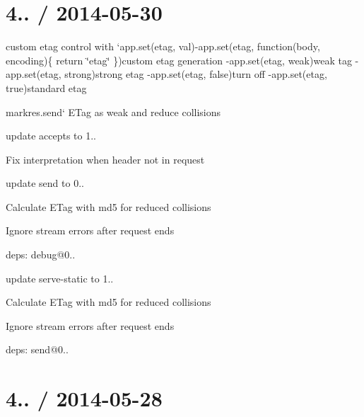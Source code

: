 \section*{4.. / 2014-\/05-\/30 }


\begin{DoxyItemize}
\item custom etag control with `app.set(\textquotesingle{}etag\textquotesingle{}, val){\ttfamily  -\/}app.\+set(\textquotesingle{}etag\textquotesingle{}, function(body, encoding)\{ return \textquotesingle{}\char`\"{}etag\char`\"{}\textquotesingle{} \}){\ttfamily custom etag generation -\/}app.\+set(\textquotesingle{}etag\textquotesingle{}, \textquotesingle{}weak\textquotesingle{}){\ttfamily weak tag -\/}app.\+set(\textquotesingle{}etag\textquotesingle{}, \textquotesingle{}strong\textquotesingle{}){\ttfamily strong etag -\/}app.\+set(\textquotesingle{}etag\textquotesingle{}, false){\ttfamily turn off -\/}app.\+set(\textquotesingle{}etag\textquotesingle{}, true){\ttfamily standard etag}
\item {\ttfamily mark}res.\+send` E\+Tag as weak and reduce collisions
\item update accepts to 1..
\begin{DoxyItemize}
\item Fix interpretation when header not in request
\end{DoxyItemize}
\item update send to 0..
\begin{DoxyItemize}
\item Calculate E\+Tag with md5 for reduced collisions
\item Ignore stream errors after request ends
\item deps\+: debug@0..
\end{DoxyItemize}
\item update serve-\/static to 1..
\begin{DoxyItemize}
\item Calculate E\+Tag with md5 for reduced collisions
\item Ignore stream errors after request ends
\item deps\+: send@0..
\end{DoxyItemize}
\end{DoxyItemize}

\section*{4.. / 2014-\/05-\/28 }


